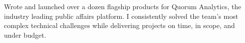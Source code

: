 \documentclass[]{article}
\def\Plus{\texttt{+}}
\begin{document}

\vspace{5pt}


Wrote and launched over a dozen flagship products for Quorum Analytics, the industry leading public affairs platform. I consistently solved the team's most complex technical challenges while delivering projects on time, in scope, and under budget.
\end{document}
